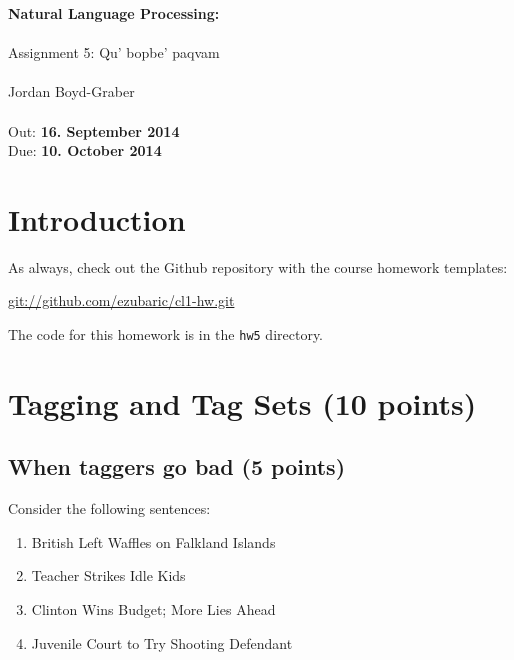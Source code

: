 \documentclass[11pt]{article}
\begin{document}
\begin{center}
{\Large{\textbf{ Natural Language Processing:  }}}\\
\mbox{}\\
{\Large{Assignment 5: Qu' bopbe' paqvam}}\\
\mbox{}\\
{\large{Jordan Boyd-Graber}}\\
\mbox{}\\
{\large{Out: \textbf{16. September 2014}\\Due: \textbf{10. October 2014}}}\\
\end{center}


{}

\section*{Introduction} %
\label{sec:introduction}
As always, check out the Github repository with the course homework templates:

\url{git://github.com/ezubaric/cl1-hw.git}

The code for this homework is in the \texttt{hw5} directory.

\section{Tagging and Tag Sets (10 points)}

\subsection{When taggers go bad (5 points)}

Consider the following sentences:
\begin{enumerate}
\item British Left Waffles on Falkland Islands
\item Teacher Strikes Idle Kids
\item Clinton Wins Budget; More Lies Ahead
\item Juvenile Court to Try Shooting Defendant
\end{enumerate}
\end{document}

